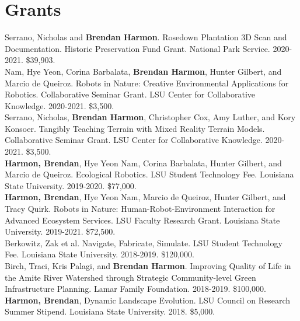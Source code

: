 \documentclass[]{baharmon-cv}
\begin{document}


\section{Grants} 

Serrano, Nicholas and \textbf{Brendan Harmon}. 
Rosedown Plantation 3D Scan and Documentation. 
Historic Preservation Fund Grant. National Park Service. 
2020-2021. \$39,903.\\

Nam, Hye Yeon, Corina Barbalata, \textbf{Brendan Harmon}, Hunter Gilbert, and Marcio de Queiroz.
Robots in Nature: Creative Environmental Applications for Robotics.
Collaborative Seminar Grant. LSU Center for Collaborative Knowledge.
2020-2021. \$3,500.\\

Serrano, Nicholas, \textbf{Brendan Harmon}, Christopher Cox, Amy Luther, and Kory Konsoer.
Tangibly Teaching Terrain with Mixed Reality Terrain Models.
Collaborative Seminar Grant. LSU Center for Collaborative Knowledge.
2020-2021. \$3,500.\\

\textbf{Harmon, Brendan}, Hye Yeon Nam, Corina Barbalata, Hunter Gilbert, and Marcio de Queiroz.
Ecological Robotics.
LSU Student Technology Fee. Louisiana State University. 
2019-2020.	\$77,000.\\

\textbf{Harmon, Brendan}, Hye Yeon Nam, Marcio de Queiroz, Hunter Gilbert, and Tracy Quirk. 
Robots in Nature: Human-Robot-Environment Interaction for Advanced Ecosystem Services. 
LSU Faculty Research Grant. Louisiana State University. 
2019-2021. \$72,500.\\

Berkowitz, Zak et al. Navigate, Fabricate, Simulate. 
LSU Student Technology Fee. Louisiana State University. 
2018-2019.	\$120,000.\\

Birch, Traci, Kris Palagi, and \textbf{Brendan Harmon}. 
Improving Quality of Life in the Amite River Watershed through Strategic Community-level Green Infrastructure Planning. 
Lamar Family Foundation. 
2018-2019. \$100,000.\\

\textbf{Harmon, Brendan}, 
Dynamic Landscape Evolution. 
LSU Council on Research Summer Stipend. Louisiana State University. 
2018. \$5,000.\\
\end{document}

